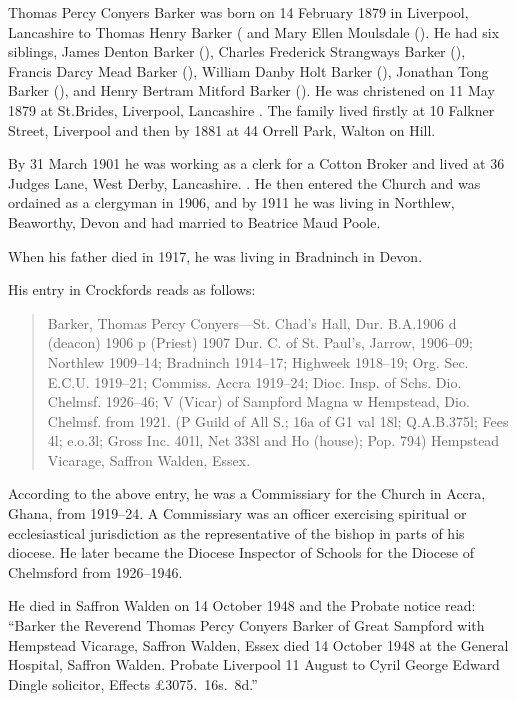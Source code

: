 
Thomas Percy Conyers Barker was born on 14 February 1879 in Liverpool, Lancashire to Thomas Henry Barker ( and Mary Ellen Moulsdale ().  He had six siblings, James Denton Barker (), Charles Frederick Strangways Barker (),  Francis Darcy Mead Barker (), William Danby Holt Barker (),
Jonathan Tong Barker (), and Henry Bertram Mitford Barker ().
He was christened on 11 May 1879 at St.Brides, Liverpool, Lancashire  \cite{TPCBarkerBirth}. The family lived firstly at 10 Falkner Street, Liverpool  and then by 1881 at 44 Orrell Park, Walton on Hill. \cite{TPCBarkerResidence}

By 31 March 1901 he was working as a clerk for a Cotton Broker and lived at 36 Judges Lane, West Derby, Lancashire. \cite{TPCBarker1901}.  He then entered the Church and was ordained as a clergyman in 1906, and by 1911 he  was living in Northlew, Beaworthy, Devon  \cite{TPCBarker1911} and had married to Beatrice Maud Poole.

When his father died in 1917, he was living in Bradninch in Devon.\cite{THBdeathcert}

His entry in Crockfords reads as follows: \cite{TPCBarkerCrockfords}

\begin{quotation}
Barker, Thomas Percy Conyers---St. Chad's Hall, Dur. B.A.1906 d (deacon) 1906 p (Priest) 1907 Dur. C. of St. Paul's, Jarrow, 1906--09; Northlew 1909--14; Bradninch 1914--17; Highweek 1918--19; Org. Sec. E.C.U. 1919--21; Commiss. Accra 1919--24; Dioc. Insp. of Schs. Dio. Chelmsf. 1926--46; V (Vicar) of Sampford Magna w Hempstead, Dio. Chelmsf. from 1921. (P Guild of All S.; 16a of G1 val 18l; Q.A.B.375l; Fees 4l; e.o.3l; Gross Inc. 401l, Net 338l and Ho (house); Pop. 794) Hempstead Vicarage, Saffron Walden, Essex.
\end{quotation}

According to the above entry, he was a Commissiary for the Church in Accra, Ghana, from 1919--24.  A Commissiary was an officer exercising spiritual or ecclesiastical jurisdiction as the representative of the bishop in parts of his diocese.  He later became the Diocese Inspector of Schools for the Diocese of Chelmsford from 1926--1946.

He died in Saffron Walden on 14 October 1948 \cite{TPCBarkerDeath} and the Probate notice read: ``Barker the Reverend Thomas Percy Conyers Barker of Great Sampford with Hempstead Vicarage, Saffron Walden, Essex died 14 October 1948 at the General Hospital, Saffron Walden. Probate Liverpool 11 August to Cyril George Edward Dingle solicitor, Effects \pounds 3075.~16s.~8d.''
